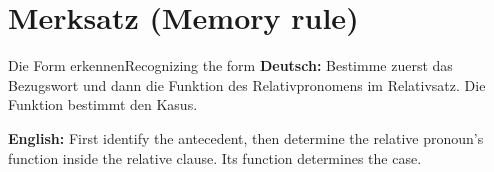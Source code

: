 \documentclass[a4paper,11pt]{article}
\newcommand{\GermanText}[1]{\textbf{Deutsch: }#1\par}
\newcommand{\EnglishText}[1]{{\small\color{SoftGray}\textbf{English: }#1\par}}
\begin{document}
\section{Merksatz (Memory rule)}
\begin{grammarentry}{Die Form erkennen}{Recognizing the form}
\GermanText{Bestimme zuerst das Bezugswort und dann die Funktion des Relativpronomens im Relativsatz. Die Funktion bestimmt den Kasus.}
\EnglishText{First identify the antecedent, then determine the relative pronoun's function inside the relative clause. Its function determines the case.}
\end{grammarentry}
\end{document}

